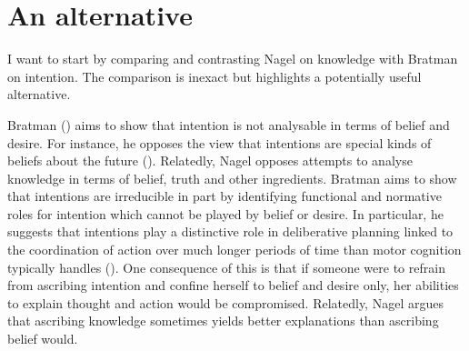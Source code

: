 \documentclass[11pt,a4paper]{extarticle}
\begin{document}
\setlength\footnotesep{1em}




\maketitle

\begin{abstract}
\noindent
***


\end{abstract}




\section{An alternative}
I want to start by
comparing and contrasting
Nagel on knowledge
with 
Bratman on intention.
The comparison is inexact but highlights a potentially useful alternative.

Bratman
(\citeyear{bratman_faces_1999,Bratman:1987xw})
aims to show that intention is not analysable in terms of belief and desire.
For instance, he opposes the view that intentions are special kinds of beliefs about the future (\citeyear[pp.\ 257ff]{bratman_faces_1999}).
Relatedly, Nagel
opposes attempts to analyse knowledge in terms of belief, truth and other ingredients.
Bratman aims to show that intentions are irreducible in part by  identifying functional and normative roles for intention which cannot be played by belief or desire.
In particular, he suggests that intentions play a distinctive role in deliberative planning linked to the coordination of action over  much longer periods of time than motor cognition typically handles
(\citeyear[p.\ 223]{bratman_faces_1999}).
One consequence of this is that if someone were to refrain from ascribing intention and confine herself to belief and desire only, her abilities to explain thought and action would be compromised.
Relatedly, Nagel argues that ascribing knowledge sometimes yields  better explanations than ascribing belief would.
\end{document}

